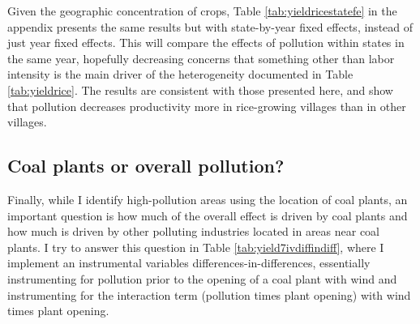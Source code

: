 \documentclass[
]{article}
\begin{document}
Given the geographic concentration of crops, Table \ref{tab:yieldricestatefe} in the appendix presents the same results but with state-by-year fixed effects, instead of just year fixed effects. This will compare the effects of pollution within states in the same year, hopefully decreasing concerns that something other than labor intensity is the main driver of the heterogeneity documented in Table \ref{tab:yieldrice}. The results are consistent with those presented here, and show that pollution decreases productivity more in rice-growing villages than in other villages.

\hypertarget{coal-plants-or-overall-pollution}{%
\subsection{Coal plants or overall pollution?}\label{coal-plants-or-overall-pollution}}

Finally, while I identify high-pollution areas using the location of coal plants, an important question is how much of the overall effect is driven by coal plants and how much is driven by other polluting industries located in areas near coal plants. I try to answer this question in Table \ref{tab:yield7ivdiffindiff}, where I implement an instrumental variables differences-in-differences, essentially instrumenting for pollution prior to the opening of a coal plant with wind and instrumenting for the interaction term (pollution times plant opening) with wind times plant opening.
\end{document}
